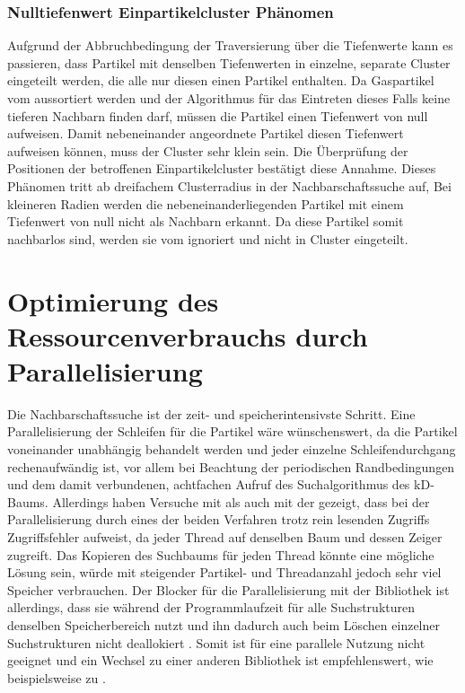 \subsubsection*{Nulltiefenwert Einpartikelcluster Phänomen} %

Aufgrund der Abbruchbedingung der Traversierung über die Tiefenwerte kann es passieren, dass Partikel mit denselben Tiefenwerten in einzelne, separate Cluster eingeteilt werden, die alle nur diesen einen Partikel enthalten. Da Gaspartikel vom \CFD aussortiert werden und der Algorithmus für das Eintreten dieses Falls keine tieferen Nachbarn finden darf, müssen die Partikel einen Tiefenwert von null aufweisen. Damit nebeneinander angeordnete Partikel diesen Tiefenwert aufweisen können, muss der Cluster sehr klein sein. %
Die Überprüfung der Positionen der betroffenen Einpartikelcluster bestätigt diese Annahme. %
Dieses Phänomen tritt ab dreifachem Clusterradius in der Nachbarschaftssuche auf, Bei kleineren Radien werden die nebeneinanderliegenden Partikel mit einem Tiefenwert von null nicht als Nachbarn erkannt. Da diese Partikel somit nachbarlos sind, werden sie vom \CFD ignoriert und nicht in Cluster eingeteilt.


\section{Optimierung des Ressourcenverbrauchs durch Parallelisierung}
Die Nachbarschaftssuche ist der zeit- und speicherintensivste Schritt. Eine Parallelisierung der Schleifen für die Partikel wäre wünschenswert, da die Partikel voneinander unabhängig behandelt werden und jeder einzelne Schleifendurchgang rechenaufwändig ist, vor allem bei Beachtung der periodischen Randbedingungen und dem damit verbundenen, achtfachen Aufruf des Suchalgorithmus des kD-Baums. Allerdings haben Versuche mit  als auch mit der  gezeigt, dass  bei der Parallelisierung durch eines der beiden Verfahren trotz rein lesenden Zugriffs Zugriffsfehler aufweist, da jeder Thread auf denselben Baum und dessen Zeiger zugreift. Das Kopieren des Suchbaums für jeden Thread könnte eine mögliche Lösung sein, würde mit steigender Partikel- und Threadanzahl jedoch sehr viel Speicher verbrauchen. %
Der Blocker für die Parallelisierung mit der  Bibliothek ist allerdings, dass sie während der Programmlaufzeit für alle Suchstrukturen denselben Speicherbereich nutzt und ihn dadurch auch beim Löschen einzelner Suchstrukturen nicht deallokiert \cite[S.~8]{mount2010ann}. Somit ist  für eine parallele Nutzung nicht geeignet und ein Wechsel zu einer anderen Bibliothek ist empfehlenswert, wie beispielsweise zu  \cite{ohara2013annAlgo} \cite{wijewardena2014annPerformance}.

